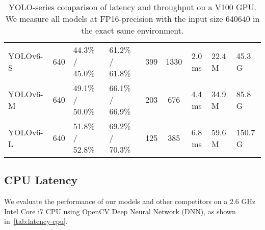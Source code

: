 \documentclass[10pt,twocolumn,letterpaper]{article}
\begin{document}
\begin{table}[ht]
{\begin{tabular}{l|HHHc|c|cHH}
      YOLOv6-S & 640 & 44.3\% / 45.0\% & 61.2\% / 61.8\% & 399 & 1330 &2.0 ms & 22.4 M & 45.3 G \\
      YOLOv6-M & 640 & 49.1\% / 50.0\% & 66.1\% / 66.9\% & 203 & 676 & 4.4 ms & 34.9 M & 85.8 G \\
      YOLOv6-L & 640 & 51.8\% / 52.8\% & 69.2\% / 70.3\% & 125 & 385 & 6.8 ms & 59.6 M & 150.7 G \\
      \bottomrule
		\end{tabular}
	}
	\caption{
    YOLO-series comparison of latency and throughput on a V100 GPU. We measure all models at FP16-precision with the input size 640640 in the exact same environment.
	}
	\label{tab:latency-qps-v100}
\end{table}

\subsection{CPU Latency}
We evaluate the performance of our models and other competitors on a 2.6 GHz  Intel Core i7 CPU using OpenCV Deep Neural Network (DNN), as shown in~\cref{tab:latency-cpu}.
\end{document}

